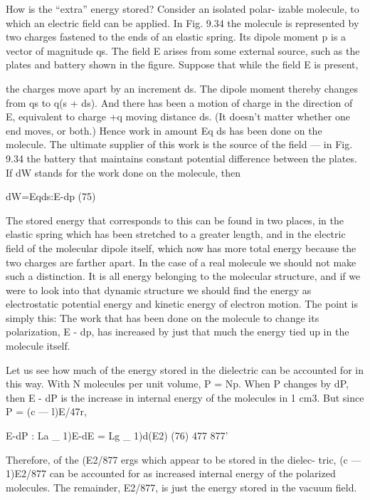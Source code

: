 {{How is the ``extra'' energy stored? Consider an isolated polar-
izable molecule, to which an electric field can be applied. In Fig. 9.34
the molecule is represented by two charges fastened to the ends of
an elastic spring. Its dipole moment p is a vector of magnitude qs.
The field E arises from some external source, such as the plates and
battery shown in the figure. Suppose that while the field E is present,

the charges move apart by an increment ds. The dipole moment
thereby changes from qs to q(s + ds). And there has been a motion
of charge in the direction of E, equivalent to charge +q moving distance
ds. (It doesn't matter whether one end moves, or both.)
Hence work in amount Eq ds has been done on the molecule. The
ultimate supplier of this work is the source of the field --- in Fig. 9.34
the battery that maintains constant potential difference between the
plates. If dW stands for the work done on the molecule, then

\begin{equation}
\end{equation}
dW=Eqds:E-dp (75)

The stored energy that corresponds to this can be found in two
places, in the elastic spring which has been stretched to a greater
length, and in the electric field of the molecular dipole itself, which
now has more total energy because the two charges are farther apart.
In the case of a real molecule we should not make such a distinction.
It is all energy belonging to the molecular structure, and if we were
to look into that dynamic structure we should find the energy as
electrostatic potential energy and kinetic energy of electron motion.
The point is simply this: The work that has been done on the molecule
to change its polarization, E - dp, has increased by just that much
the energy tied up in the molecule itself.

Let us see how much of the energy stored in the dielectric can be
accounted for in this way. With N molecules per unit volume,
P = Np. When P changes by dP, then E - dP is the increase in internal
energy of the molecules in 1 cm3. But since P = (c  ---  l)E/47r,

\begin{equation}
\end{equation}
E-dP : La _ 1)E-dE = Lg _ 1)d(E2) (76)
477 877'

Therefore, of the (E2/877 ergs which appear to be stored in the dielec-
tric, (c  ---  1)E2/877 can be accounted for as increased internal energy
of the polarized molecules. The remainder, E2/877, is just the energy
stored in the vacuum field.

}}
